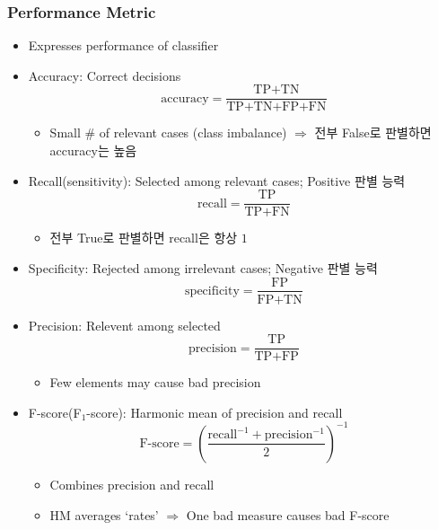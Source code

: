 \subsubsection*{Performance Metric}
\begin{itemize}
    \item Expresses performance of classifier
    \item Accuracy: Correct decisions
    \begin{equation}
        \text{accuracy}=\frac{\text{TP+TN}}{\text{TP+TN+FP+FN}}
    \end{equation}
    \begin{itemize}
        \item Small \# of relevant cases (class imbalance) $\Rightarrow$ 전부 False로 판별하면 accuracy는 높음
    \end{itemize}
    \item Recall(sensitivity): Selected among relevant cases; Positive 판별 능력
    \begin{equation}
        \text{recall}=\frac{\text{TP}}{\text{TP+FN}}
    \end{equation}
    \begin{itemize}
        \item 전부 True로 판별하면 recall은 항상 $1$
    \end{itemize}
    \item Specificity: Rejected among irrelevant cases; Negative 판별 능력
    \begin{equation}
        \text{specificity}=\frac{\text{FP}}{\text{FP+TN}}
    \end{equation}
    \item Precision: Relevent among selected
    \begin{equation}
        \text{precision}=\frac{\text{TP}}{\text{TP+FP}}
    \end{equation}
    \begin{itemize}
        \item Few elements may cause bad precision
    \end{itemize}
    \item F-score(F$_1$-score): Harmonic mean of precision and recall
    \begin{equation}
        \text{F-score}=\left(\frac{\text{recall}^{-1}+\text{precision}^{-1}}{2}\right)^{-1}
    \end{equation}
    \begin{itemize}
        \item Combines precision and recall
        \item HM averages `rates' $\Rightarrow$ One bad measure causes bad F-score
    \end{itemize}
\end{itemize}

